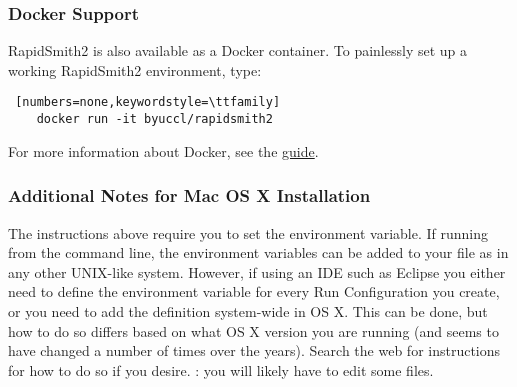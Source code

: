\subsubsection{Docker Support}

RapidSmith2 is also available as a Docker container. To painlessly set up a working RapidSmith2 environment, type:

\begin{lstlisting} [numbers=none,keywordstyle=\ttfamily]
	docker run -it byuccl/rapidsmith2
\end{lstlisting}

\noindent For more information about Docker, see the
\href{https://docs.docker.com/engine/getstarted/}{\color{blue}guide}.

\subsubsection{Additional Notes for Mac OS X Installation}

The instructions above require you to set the 
environment variable.  If running from the command line, the environment
variables can be added to your  file as in any other
UNIX-like system.  However, if using an IDE such as Eclipse you either need to
define the environment variable for every Run Configuration you create, or you
need to add the  definition system-wide in OS X. This can
be done, but how to do so differs based on what OS X version you are running
(and seems to have changed a number of times over the years). Search the web for
instructions for how to do so if you desire. : you will likely have
to edit some  files.


